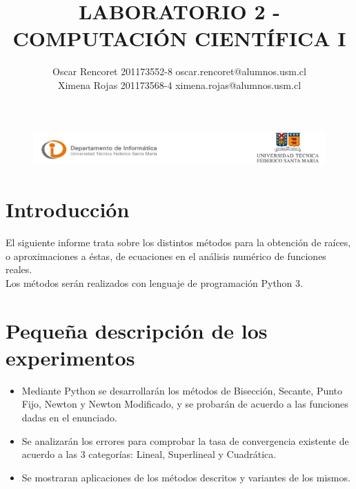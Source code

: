 \documentclass{article}
\title{\textbf{LABORATORIO 2 - COMPUTACIÓN CIENTÍFICA I}}
\author{Oscar Rencoret 201173552-8 oscar.rencoret@alumnos.usm.cl \\ Ximena Rojas 201173568-4 ximena.rojas@alumnos.usm.cl}
\date{}
\begin{document}
\begin{figure}
\begin{center}
\includegraphics[width=450pt]{Logos}
\end{center}
\end{figure}

\maketitle

\section{Introducción}
El siguiente informe trata sobre los distintos métodos para la obtención de raíces, o aproximaciones a éstas, de ecuaciones en el análisis numérico de funciones reales. \\
Los métodos serán realizados con lenguaje de programación Python 3.

\section{Pequeña descripción de los experimentos}
\begin{itemize}
\item Mediante Python se desarrollarán los métodos de Bisección, Secante, Punto Fijo, Newton y Newton Modificado, y se probarán de acuerdo a las funciones dadas en el enunciado.

\item Se analizarán los errores para comprobar la tasa de convergencia existente de acuerdo a las 3 categorías: Lineal, Superlineal y Cuadrática.

\item Se mostraran aplicaciones de los métodos descritos y variantes de los mismos.
\end{itemize}
\end{document}
